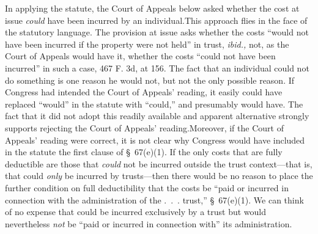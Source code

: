   In applying the statute, the Court of Appeals below asked whether the cost at issue \emph{could} have been incurred by an individual.\footnotemark[3] This approach flies in the face of the statutory \newpage  language. The provision at issue asks whether the costs ``would not have been incurred if the property were not held'' in trust, \emph{ibid.,} not, as the Court of Appeals would have it, whether the costs ``could not have been incurred'' in such a case, 467 F. 3d, at 156. The fact that an individual could not do something is one reason he would not, but not the only possible reason. If Congress had intended the Court of Appeals' reading, it easily could have replaced ``would'' in the statute with ``could,'' and presumably would have. The fact that it did not adopt this readily available and apparent alternative strongly supports rejecting the Court of Appeals' reading.\footnotemark[4] Moreover, if the Court of Appeals' reading were correct, it is not clear why Congress would have included in the stat\newpage ute the first clause of \S~67(e)(1). If the only costs that are fully deductible are those that \emph{could} not be incurred outside the trust context---that is, that could \emph{only} be incurred by trusts---then there would be no reason to place the further condition on full deductibility that the costs be ``paid or incurred in connection with the administration of the .~.~. trust,'' \S~67(e)(1). We can think of no expense that could be incurred exclusively by a trust but would nevertheless \emph{not} be ``paid or incurred in connection with'' its administration.

